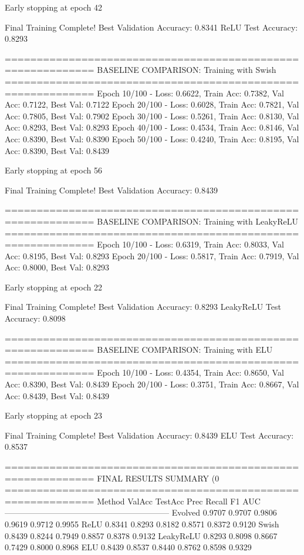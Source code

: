 Early stopping at epoch 42

Final Training Complete!
Best Validation Accuracy: 0.8341
ReLU Test Accuracy: 0.8293

============================================================
BASELINE COMPARISON: Training with Swish
============================================================
Epoch  10/100 - Loss: 0.6622, Train Acc: 0.7382, Val Acc: 0.7122, Best Val: 0.7122
Epoch  20/100 - Loss: 0.6028, Train Acc: 0.7821, Val Acc: 0.7805, Best Val: 0.7902
Epoch  30/100 - Loss: 0.5261, Train Acc: 0.8130, Val Acc: 0.8293, Best Val: 0.8293
Epoch  40/100 - Loss: 0.4534, Train Acc: 0.8146, Val Acc: 0.8390, Best Val: 0.8390
Epoch  50/100 - Loss: 0.4240, Train Acc: 0.8195, Val Acc: 0.8390, Best Val: 0.8439

Early stopping at epoch 56

Final Training Complete!
Best Validation Accuracy: 0.8439

============================================================
BASELINE COMPARISON: Training with LeakyReLU
============================================================
Epoch  10/100 - Loss: 0.6319, Train Acc: 0.8033, Val Acc: 0.8195, Best Val: 0.8293
Epoch  20/100 - Loss: 0.5817, Train Acc: 0.7919, Val Acc: 0.8000, Best Val: 0.8293

Early stopping at epoch 22

Final Training Complete!
Best Validation Accuracy: 0.8293
LeakyReLU Test Accuracy: 0.8098

============================================================
BASELINE COMPARISON: Training with ELU
============================================================
Epoch  10/100 - Loss: 0.4354, Train Acc: 0.8650, Val Acc: 0.8390, Best Val: 0.8439
Epoch  20/100 - Loss: 0.3751, Train Acc: 0.8667, Val Acc: 0.8439, Best Val: 0.8439

Early stopping at epoch 23

Final Training Complete!
Best Validation Accuracy: 0.8439
ELU Test Accuracy: 0.8537

============================================================
FINAL RESULTS SUMMARY (0%
============================================================
Method             ValAcc     TestAcc    Prec       Recall     F1         AUC
------------------------------------------------------------
Evolved            0.9707     0.9707     0.9806     0.9619     0.9712     0.9955
ReLU               0.8341     0.8293     0.8182     0.8571     0.8372     0.9120
Swish              0.8439     0.8244     0.7949     0.8857     0.8378     0.9132
LeakyReLU          0.8293     0.8098     0.8667     0.7429     0.8000     0.8968
ELU                0.8439     0.8537     0.8440     0.8762     0.8598     0.9329

